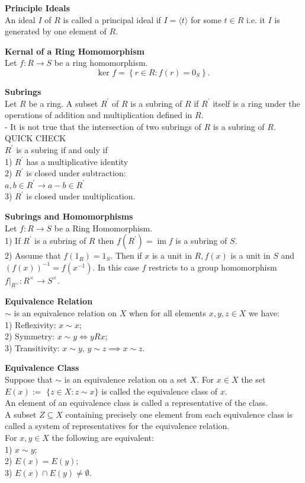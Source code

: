 \documentclass[a4paper, 10pt]{article}
\begin{document}
\begin{multicols*}{3}
\textbf{Principle Ideals}\\
An ideal $I$ of $R$ is called a principal ideal if $I=\langle t\rangle$ for some $t \in R$ i.e. it $I$ is generated by one element of $R$.

\textbf{Kernal of a Ring Homomorphism}\\
Let $f: R \rightarrow S$ be a ring homomorphism. 
$$
\text { ker } f=\left\{r \in R: f(r)=0_S\right\} \text {. }
$$

\textbf{Subrings}\\
Let $R$ be a ring. A subset $R^{\prime}$ of $R$ is a subring of $R$ if $R^{\prime}$ itself is a ring under the operations of addition and multiplication defined in $R$.\\
- It is not true that the intersection of two subrings of $R$ is a subring of $R$.\\
QUICK CHECK\\
$R^{\prime}$ is a subring if and only if\\
1) $R^{\prime}$ has a multiplicative identity\\
2) $R^{\prime}$ is closed under subtraction: \\
$a, b \in R^{\prime} \rightarrow a-b \in R^{\prime}$\\
3) $R^{\prime}$ is closed under multiplication.

\textbf{Subrings and Homomorphisms}\\
Let $f: R \rightarrow S$ be a Ring Homomorphism.\\
1) If $R^{\prime}$ is a subring of $R$ then $f\left(R^{\prime}\right)=\operatorname{im} f$ is a subring of $S$.\\ 
2) Assume that $f\left(1_R\right)=1_S$. Then if $x$ is a unit in $R, f(x)$ is a unit in $S$ and $(f(x))^{-1}=f\left(x^{-1}\right)$. In this case $f$ restricts to a group homomorphism $\left.f\right|_{R^{\times}}: R^{\times} \rightarrow S^{\times}$.

\textbf{Equivalence Relation}\\
$\sim$ is an equivalence relation on $X$ when for all elements $x, y, z \in X$ we have:\\
1) Reflexivity: $x \sim x$;\\
2) Symmetry: $x \sim y \iff y R x$;\\
3) Transitivity: $x \sim y, \,y \sim z \implies x \sim z$.

\textbf{Equivalence Class}\\
Suppose that $\sim$ is an equivalence relation on a set $X$. For $x \in X$ the set $E(x):=$ $\{z \in X: z \sim x\}$ is called the equivalence class of $x$. \\
An element of an equivalence class is called a representative of the class. \\
A subset $Z \subseteq X$ containing precisely one element from each equivalence class is called a system of representatives for the equivalence relation.\\
For $x, y \in X$ the following are equivalent:\\
1) $x \sim y$;\\
2) $E(x)=E(y)$;\\
3) $E(x) \cap E(y) \neq \emptyset$.


\end{multicols*}
\end{document}
